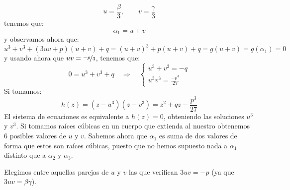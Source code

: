 \begin{equation*}
    u = \frac{\beta}{3}, \qquad v = \frac{\gamma}{3}
\end{equation*}
tenemos que:
\begin{equation*}
    \alpha_1 = u+v
\end{equation*}
y observamos ahora que:
\begin{equation*}
    u^3 + v^3 + (3uv+p)(u+v) + q = {(u+v)}^{3} + p(u+v) + q = g(u+v) = g(\alpha_1) = 0
\end{equation*}
y usando ahora que $uv = \nicefrac{-p}{3}$, tenemos que:
\begin{equation*}
    0 = u^3 + v^3 + q \quad\Longrightarrow\quad \left\{\begin{array}{l}
        u^3 + v^3 = -q \\
        u^3 v^3 = \frac{-p^3}{27}
    \end{array}\right.
\end{equation*}
Si tomamos:
\begin{equation*}
    h(z) = (z-u^3)(z-v^3) = z^2 + qz - \frac{p^3}{27}
\end{equation*}
El sistema de ecuaciones es equivalente a $h(z) = 0$, obteniendo las soluciones $u^3$ y $v^3$. Si tomamos raíces cúbicas en un cuerpo que extienda al nuestro obtenemos 6 posibles valores de $u$ y $v$. Sabemos ahora que $\alpha_1$ es suma de dos valores de forma que estos son raíces cúbicas, puesto que no hemos supuesto nada a $\alpha_1$ distinto que a $\alpha_2$ y $\alpha_3$.

\noindent
Elegimos entre aquellas parejas de $u$ y $v$ las que verifican $3uv = -p$ (ya que $3uv = \beta\gamma$).

